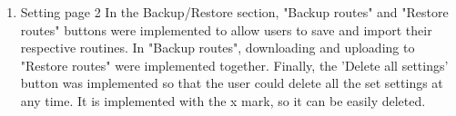\begin{enumerate}[label=\arabic*.]
\begin{enumerate}[label*={\arabic*.},ref=\theenumi.\arabic*]
                    \newpage
                      \setlength{\itemindent}{0.5cm}
                      \item Setting page 2
                          In the Backup/Restore section, "Backup routes" and "Restore routes" buttons were implemented to allow users to save and import their respective routines. In "Backup routes", downloading and uploading to "Restore routes" were implemented together. Finally, the 'Delete all settings' button was implemented so that the user could delete all the set settings at any time. It is implemented with the x mark, so it can be easily deleted. \\\\
          \end{enumerate}
\end{enumerate}